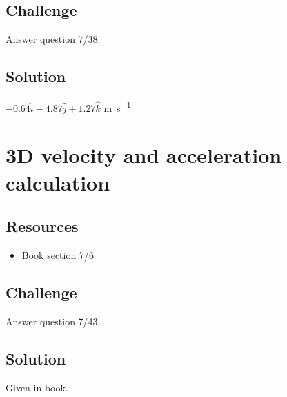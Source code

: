 \subsection*{Challenge}
Answer question 7/38.

\subsection*{Solution}
$-0.64 \hat{i} - 4.87 \hat{j} + 1.27 \hat{k}$ \si{\meter\per\second}




\newpage
\section{3D velocity and acceleration calculation}

\subsection*{Resources}
\begin{itemize}
    \item Book section 7/6
\end{itemize}

\subsection*{Challenge}
Answer question 7/43.

\subsection*{Solution}
Given in book.
\fi
